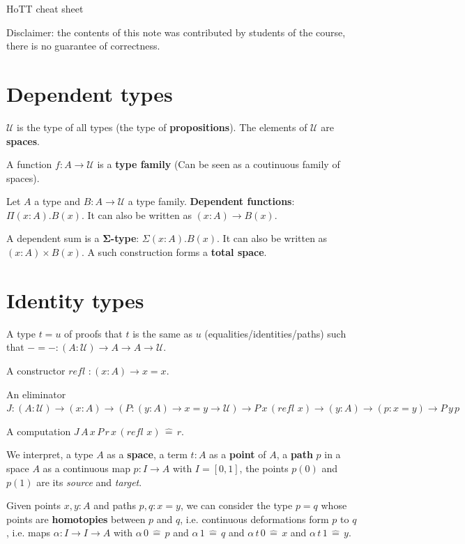 \documentclass[a4paper]{article}
\begin{document}
\begin{center}
  \Large HoTT cheat sheet
\end{center}

\noindent
{\footnotesize Disclaimer: the contents of this note was contributed by students of the course, there is no guarantee of correctness.}

\section*{Dependent types}

$\mathcal{U}$ is the type of all types (the type of \textbf{propositions}). The elements of $\mathcal{U}$ are \textbf{spaces}.

A function $f: A \to \mathcal{U}$ is a \textbf{type family} (Can be seen as a coutinuous family of spaces).

Let $A$ a type and $B: A \to \mathcal{U}$ a type family. \textbf{Dependent functions}: $\Pi(x:A).B(x)$. It can also be written as $(x:A) \to B(x)$.

A dependent sum is a $\bm{\Sigma}$\textbf{-type}: $\Sigma(x:A).B(x)$. It can also be written as $(x:A) \times B(x)$. A such construction forms a \textbf{total space}.

\section*{Identity types}

A type $t = u$ of proofs that $t$ is the same as $u$ (equalities/identities/paths) such that $- = - : (A : \mathcal{U}) \to A \to A \to \mathcal{U}$.

A constructor $\textit{refl } : (x : A) \to x = x$.

An eliminator $J : (A : \mathcal{U}) \to (x : A) \to (P : (y : A) \to x = y \to \mathcal{U}) \to P \, x \, (\textit{refl } x) \to (y : A) \to (p : x = y) \to P \, y \, p$

A computation $J \, A \, x \, P \, r \, x \, (\textit{refl } x) \, \hat{=} \, r$.

We interpret, a type $A$ as a \textbf{space}, a term $t : A$ as a \textbf{point} of $A$, a \textbf{path} $p$ in a space $A$ as a continuous map $p : I \to A$ with $I = [0,1]$, the points $p(0)$ and $p(1)$ are its \textit{source} and \textit{target}.

Given points $x,y:A$ and paths $p,q: x=y$, we can consider the type $p=q$ whose points are \textbf{homotopies} between $p$ and $q$, i.e. continuous deformations form $p$ to $q$, i.e. maps $\alpha : I \to I \to A$ with $\alpha \, 0 \, \hat{=} \, p$ and $\alpha \, 1 \, \hat{=} \, q$ and $\alpha \, t \, 0 \, \hat{=} \, x$ and $\alpha \, t \, 1 \, \hat{=} \, y$.
\end{document}

